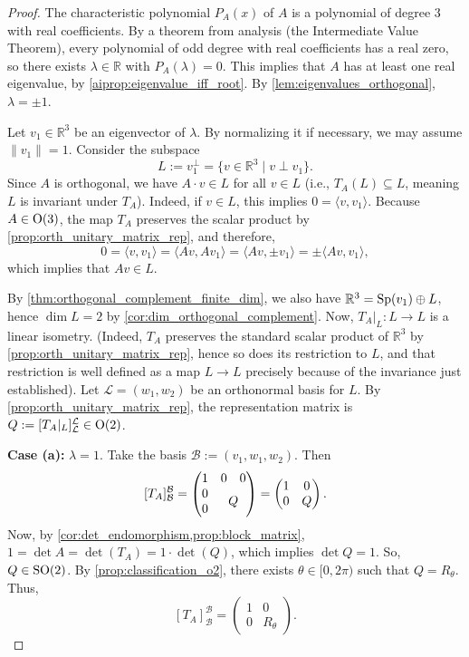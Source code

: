 \begin{proof}
The characteristic polynomial $P_A(x)$ of $A$ is a polynomial of degree $3$ with real coefficients. By a theorem from analysis (the Intermediate Value Theorem), every polynomial of odd degree with real coefficients has a real zero, so there exists $\lambda \in \mathbb{R}$ with $P_A(\lambda) = 0$. This implies that $A$ has at least one real eigenvalue, by \cref{aiprop:eigenvalue_iff_root}.
By \cref{lem:eigenvalues_orthogonal}, $\lambda = \pm 1$.

Let $v_1 \in \mathbb{R}^3$ be an eigenvector of $\lambda$. By normalizing it if necessary, we may assume $\|v_1\| = 1$. Consider the subspace
\[ L := v_1^\perp = \{v \in \mathbb{R}^3 \mid v \perp v_1\}. \]
Since $A$ is orthogonal, we have $A \cdot v \in L$ for all $v \in L$ (i.e., $T_A(L) \subseteq L$, meaning $L$ is invariant under $T_A$).
Indeed, if $v \in L$, this implies $0 = \langle v, v_1 \rangle$. Because $A \in \operatorname{O}(3)$, the map $T_A$ preserves the scalar product by \cref{prop:orth_unitary_matrix_rep}, and therefore,
\[ 0 = \langle v, v_1 \rangle = \langle Av, Av_1 \rangle = \langle Av, \pm v_1 \rangle = \pm \langle Av, v_1 \rangle, \]
which implies that $Av \in L$.

By \cref{thm:orthogonal_complement_finite_dim}, we also have $\mathbb{R}^3 = \operatorname{Sp}(v_1) \oplus L$, hence $\dim L = 2$ by \cref{cor:dim_orthogonal_complement}.
Now, $T_A|_L \colon L \to L$ is a linear isometry.
(Indeed, $T_A$ preserves the standard scalar product of $\mathbb{R}^3$ by \cref{prop:orth_unitary_matrix_rep}, hence so does its restriction to $L$, and that restriction is well defined as a map $L \to L$ precisely because of the invariance just established).
Let $\mathcal{L} = (w_1, w_2)$ be an orthonormal basis for $L$. By \cref{prop:orth_unitary_matrix_rep}, the representation matrix is $Q := [T_A|_L]_{\mathcal{L}}^{\mathcal{L}} \in \operatorname{O}(2)$.

\textbf{Case (a):} $\lambda = 1$. Take the basis $\mathcal{B} := (v_1, w_1, w_2)$. Then
\[ [T_A]_{\mathcal{B}}^{\mathcal{B}} = \begin{pmatrix} 1 & 0 & 0 \\ 0 & \multicolumn{2}{c}{\multirow{2}{*}{$Q$}} \\ 0 & & \end{pmatrix} = \begin{pmatrix} 1 & 0 \\ 0 & Q \end{pmatrix}. \]
Now, by \cref{cor:det_endomorphism,prop:block_matrix}, $1 = \det A = \det(T_A) = 1 \cdot \det(Q)$, which implies $\det Q = 1$. 
So, $Q \in \operatorname{SO}(2)$. By \cref{prop:classification_o2}, there exists $\theta \in [0, 2\pi)$ such that $Q = R_\theta$.
Thus,
\[ [T_A]_{\mathcal{B}}^{\mathcal{B}} = \begin{pmatrix} 1 & 0 \\ 0 & R_\theta \end{pmatrix}. \]


\end{proof}
